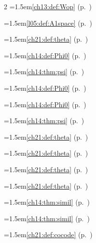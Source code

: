 \begin{multicols}{2}
\hangindent=1.5em\quad \ref{ch13:def:Wop} (p.~\pageref{ch13:def:Wop})\par
\par{}\par\nopagebreak\smallskip
\hangindent=1.5em\quad \ref{l05:def:A1space} (p.~\pageref{l05:def:A1space})\par
\par{}\par\nopagebreak\smallskip
\hangindent=1.5em\quad \ref{ch21:def:theta} (p.~\pageref{ch21:def:theta})\par
\hangindent=1.5em\quad \ref{ch14:def:Phi0} (p.~\pageref{ch14:def:Phi0})\par
\hangindent=1.5em\quad \ref{ch14:thm:psi} (p.~\pageref{ch14:thm:psi})\par
\hangindent=1.5em\quad \ref{ch14:def:Phi0} (p.~\pageref{ch14:def:Phi0})\par
\hangindent=1.5em\quad \ref{ch14:def:Phi0} (p.~\pageref{ch14:def:Phi0})\par
\hangindent=1.5em\quad \ref{ch14:thm:psi} (p.~\pageref{ch14:thm:psi})\par
\hangindent=1.5em\quad \ref{ch21:def:theta} (p.~\pageref{ch21:def:theta})\par
\hangindent=1.5em\quad \ref{ch21:def:theta} (p.~\pageref{ch21:def:theta})\par
\hangindent=1.5em\quad \ref{ch21:def:theta} (p.~\pageref{ch21:def:theta})\par
\hangindent=1.5em\quad \ref{ch21:def:theta} (p.~\pageref{ch21:def:theta})\par
\par{}\par\nopagebreak\smallskip
\hangindent=1.5em\quad \ref{ch14:thm:simil} (p.~\pageref{ch14:thm:simil})\par
\hangindent=1.5em\quad \ref{ch14:thm:simil} (p.~\pageref{ch14:thm:simil})\par
\par{}\par\nopagebreak\smallskip
\hangindent=1.5em\quad \ref{ch21:def:cocode} (p.~\pageref{ch21:def:cocode})\par
\par{}\par\nopagebreak\smallskip

\end{multicols}
